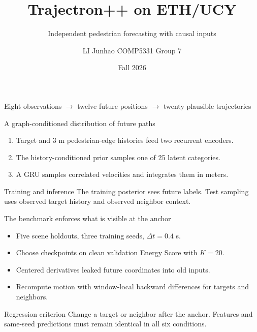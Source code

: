 \documentclass[aspectratio=169,11pt]{beamer}
\title{Trajectron++ on ETH/UCY}
\subtitle{Independent pedestrian forecasting with causal inputs}
\author{LI Junhao \quad COMP5331 Group 7}
\date{Fall 2026}
\begin{document}
\begin{frame}
\titlepage
\begin{center}
\small Eight observations $\to$ twelve future positions $\to$ twenty plausible trajectories
\end{center}
\end{frame}

\begin{frame}{A graph-conditioned distribution of future paths}
\begin{enumerate}
\item Target and 3 m pedestrian-edge histories feed two recurrent encoders.
\item The history-conditioned prior samples one of 25 latent categories.
\item A GRU samples correlated velocities and integrates them in meters.
\end{enumerate}
\begin{block}{Training and inference}
The training posterior sees future labels. Test sampling uses observed
target history and observed neighbor context.
\end{block}
\end{frame}

\begin{frame}{The benchmark enforces what is visible at the anchor}
\begin{itemize}
\item Five scene holdouts, three training seeds, $\Delta t=0.4$ s.
\item Choose checkpoints on clean validation Energy Score with $K=20$.
\item Centered derivatives leaked future coordinates into old inputs.
\item Recompute motion with window-local backward differences for targets and neighbors.
\end{itemize}
\begin{alertblock}{Regression criterion}
Change a target or neighbor after the anchor. Features and same-seed
predictions must remain identical in all six conditions.
\end{alertblock}
\end{frame}
\end{document}
